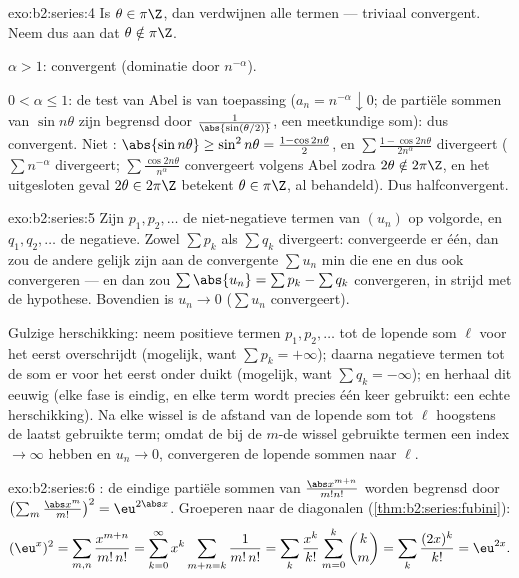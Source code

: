 \begin{solution}{exo:b2:series:4}
Is $\theta \in \pi\Z$, dan verdwijnen alle termen --- triviaal
convergent. Neem dus aan dat $\theta \notin \pi\Z$.

$\alpha > 1$:  convergent (dominatie door
$n^{-\alpha}$).

$0 < \alpha \leq 1$: de test van Abel is van toepassing ($a_n =
n^{-\alpha} \downarrow 0$; de partiële sommen van $\sin n\theta$
zijn begrensd door $\frac{1}{\abs{\sin(\theta/2)}}$, een
meetkundige som): dus convergent. Niet : $\abs{\sin
n\theta} \geq \sin^2 n\theta = \frac{1 - \cos 2n\theta}{2}$, en
$\sum \frac{1 - \cos 2n\theta}{2n^\alpha}$ divergeert ($\sum
n^{-\alpha}$ divergeert; $\sum \frac{\cos 2n\theta}{n^\alpha}$
convergeert volgens Abel zodra $2\theta \notin 2\pi\Z$, en het
uitgesloten geval $2\theta \in 2\pi\Z$ betekent $\theta \in \pi\Z$,
al behandeld). Dus halfconvergent.
\end{solution}

\begin{solution}{exo:b2:series:5}
Zijn $p_1, p_2, \dots$ de niet-negatieve termen van $(u_n)$ op
volgorde, en $q_1, q_2, \dots$ de negatieve. Zowel $\sum p_k$ als
$\sum q_k$ divergeert: convergeerde er één, dan zou de andere
gelijk zijn aan de convergente $\sum u_n$ min die ene en dus ook
convergeren --- en dan zou $\sum \abs{u_n} = \sum p_k - \sum q_k$
convergeren, in strijd met de hypothese. Bovendien is $u_n \to 0$
($\sum u_n$ convergeert).

Gulzige herschikking: neem positieve termen $p_1, p_2, \dots$ tot
de lopende som $\ell$ voor het eerst overschrijdt (mogelijk, want
$\sum p_k = +\infty$); daarna negatieve termen tot de som er voor
het eerst onder duikt (mogelijk, want $\sum q_k = -\infty$); en
herhaal dit eeuwig (elke fase is eindig, en elke term wordt precies
één keer gebruikt: een echte herschikking). Na elke wissel is de
afstand van de lopende som tot $\ell$ hoogstens de laatst gebruikte
term; omdat de bij de $m$-de wissel gebruikte termen een index $\to
\infty$ hebben en $u_n \to 0$, convergeren de lopende sommen naar
$\ell$.
\end{solution}

\begin{solution}{exo:b2:series:6}
: de eindige partiële sommen van $\frac{\abs
x^{m+n}}{m!n!}$ worden begrensd door $\bigl(\sum_m \frac{\abs
x^m}{m!}\bigr)^2 = \eu^{2\abs x}$. Groeperen naar de diagonalen
(\cref{thm:b2:series:fubini}):
\[
(\eu^{x})^2 = \sum_{m,n} \frac{x^{m+n}}{m!\,n!}
= \sum_{k=0}^{\infty} x^k \sum_{m+n=k} \frac{1}{m!\,n!}
= \sum_k \frac{x^k}{k!}\sum_{m=0}^{k}\binom km
= \sum_k \frac{(2x)^k}{k!} = \eu^{2x} .
\]
\end{solution}

